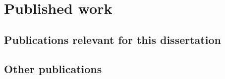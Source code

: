 \chapter{Published work}

\section*{Publications relevant for this dissertation}


\nocite{parallelintime,tn,bruteforce,railwaydispatching,omnisolver,pyqbench}
\printbibliography[heading=none,keyword=my-used]


\section*{Other publications}
\printbibliography[heading=none,keyword=my-unused]

